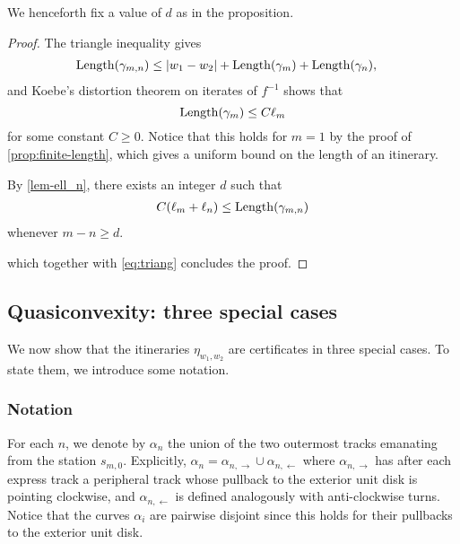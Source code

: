 We henceforth fix a value of $d$ as in the proposition.
\begin{proof}
The triangle inequality gives
\begin{equation} \label{eq:triang}
	\begin{split}
		\operatorname{Length}(\gamma_{m,n}) & \leq |w_1-w_2|+\operatorname{Length}(\gamma_m)+\operatorname{Length}(\gamma_n),
	\end{split}
\end{equation}
and Koebe's distortion theorem on iterates of $f^{-1}$ shows that
\begin{equation} \label{eq:gamma_m_not_large}
		\operatorname{Length}(\gamma_m) \leq C \ell_m
	\end{equation}
for some constant $C \geq 0$. Notice that this holds for $m=1$ by the proof of \cref{prop:finite-length}, which gives a uniform bound on the length of an itinerary.


By \cref{lem-ell_n}, there exists an integer $d$ such that
\begin{align}
C(\ell_m + \ell _n) \leq \operatorname{Length}(\gamma_{m,n})
\end{align}
whenever $m-n \geq d$.

which together with \eqref{eq:triang} concludes the proof.
\end{proof}


\subsection{Quasiconvexity: three special cases}

We now show that the itineraries $\eta_{w_1,w_2}$ are certificates in three special cases. To state them, we introduce some notation.
\subsubsection{Notation}
For each $n$, we denote by  $\alpha_n$ the union of the two outermost tracks emanating from the station $s_{m,0}$. Explicitly, $\alpha_n=\alpha_{n,\rightarrow}\cup\alpha_{n,\leftarrow}$ where $\alpha_{n,\rightarrow}$ has after each express track a peripheral track whose pullback to the exterior unit disk is pointing clockwise, and $\alpha_{n,\leftarrow}$ is defined analogously with anti-clockwise turns. Notice that the curves $\alpha_i$ are pairwise disjoint since this holds for their pullbacks to the exterior unit disk.

